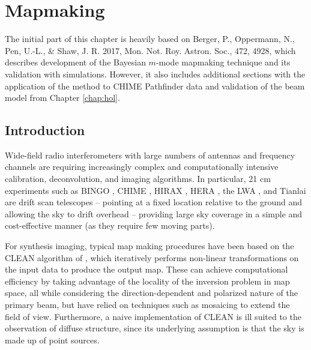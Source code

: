 \chapter{\label{chap:mapmaking} Mapmaking}

The initial part of this chapter is heavily based on 
\newline
\newline
Berger, P., Oppermann, N., Pen, U.-L., \& Shaw, J. R. 2017, Mon. Not. Roy. Astron. Soc., 472, 4928,
\newline
\newline
which describes development of the Bayesian $m$-mode mapmaking technique and its validation with simulations. However, it also includes additional sections with the application of the method to CHIME Pathfinder data and validation of the beam model from Chapter \ref{chap:hol}.

\newpage


\section{Introduction} \label{ch:mm:sec:intro}

Wide-field radio interferometers with large numbers of antennas and frequency channels are requiring increasingly complex and computationally intensive calibration, deconvolution, and imaging algorithms. In particular, 21 cm experiments such as BINGO \citep{bingoupdate},  CHIME \citep{chimepath1}, HIRAX \citep{hirax}, HERA \citep{hera}, the LWA \citep{eastwoodetal}, and Tianlai \citep{tianlai} are drift scan telescopes -- pointing at a fixed location relative to the ground and allowing the sky to drift overhead -- providing large sky coverage in a simple and cost-effective manner (as they require few moving parts).

For synthesis imaging, typical map making procedures have been based on the CLEAN algorithm of \cite{clean}, which iteratively performs non-linear transformations on the input data to produce the output map. These can achieve computational efficiency by taking advantage of the locality of the inversion problem in map space, all while considering the direction-dependent and polarized nature of the primary beam, but have relied on techniques such as mosaicing to extend the field of view. Furthermore, a naive implementation of CLEAN is ill suited to the observation of diffuse structure, since its underlying assumption is that the sky is made up of point sources.

